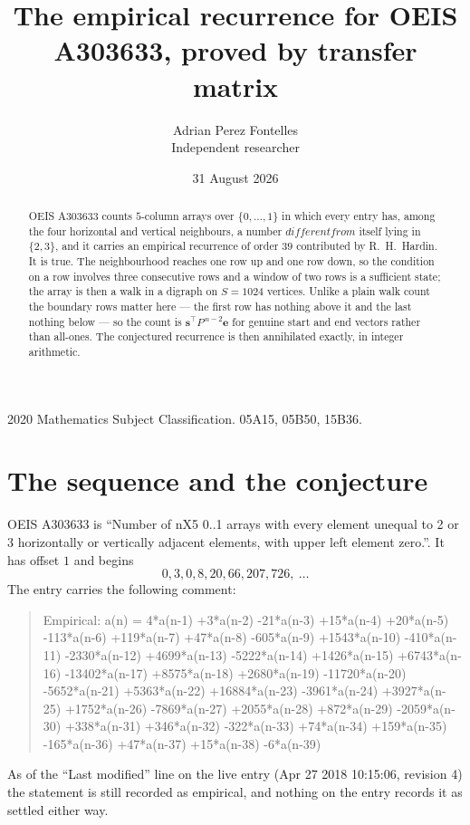 \documentclass[11pt,a4paper]{article}
\title{The empirical recurrence for OEIS A303633, proved by transfer matrix}
\author{Adrian Perez Fontelles\\ \small Independent researcher}
\date{31 August 2026}
\theoremstyle{plain}
\theoremstyle{definition}
\begin{document}
\maketitle

\begin{abstract}
OEIS A303633 counts $5$-column arrays over $\{0,\dots,1\}$ in which every entry has,
among the four horizontal and vertical neighbours, a number $different from$ itself lying in $\{2,3\}$, and it carries an empirical
recurrence of order $39$ contributed by R.~H.~Hardin. It is true. The neighbourhood
reaches one row up and one row down, so the condition on a row involves three consecutive
rows and a window of two rows is a sufficient state; the array is then a walk in a digraph
on $S=1024$ vertices. Unlike a plain walk count the boundary rows matter here --- the first
row has nothing above it and the last nothing below --- so the count is
$\mathbf{s}^{\!\top}P^{\,n-2}\mathbf{e}$ for genuine start and end vectors rather than
all-ones. The conjectured recurrence is then annihilated exactly, in integer arithmetic.
\end{abstract}

\noindent\small 2020 Mathematics Subject Classification. 05A15, 05B50, 15B36.\normalsize

\section{The sequence and the conjecture}

OEIS A303633 is ``Number of nX5 0..1 arrays with every element unequal to 2 or 3 horizontally or vertically adjacent elements, with upper left element zero.''. It has offset
$1$ and begins
\[
0, 3, 0, 8, 20, 66, 207, 726,\ \dots
\]
The entry carries the following comment:
\begin{quote}\small
Empirical: a(n) = 4*a(n-1) +3*a(n-2) -21*a(n-3) +15*a(n-4) +20*a(n-5) -113*a(n-6) +119*a(n-7) +47*a(n-8) -605*a(n-9) +1543*a(n-10) -410*a(n-11) -2330*a(n-12) +4699*a(n-13) -5222*a(n-14) +1426*a(n-15) +6743*a(n-16) -13402*a(n-17) +8575*a(n-18) +2680*a(n-19) -11720*a(n-20) -5652*a(n-21) +5363*a(n-22) +16884*a(n-23) -3961*a(n-24) +3927*a(n-25) +1752*a(n-26) -7869*a(n-27) +2055*a(n-28) +872*a(n-29) -2059*a(n-30) +338*a(n-31) +346*a(n-32) -322*a(n-33) +74*a(n-34) +159*a(n-35) -165*a(n-36) +47*a(n-37) +15*a(n-38) -6*a(n-39)
\end{quote}
As of the ``Last modified'' line on the live entry (Apr 27 2018 10:15:06, revision
4) the statement is still recorded as empirical, and nothing on the entry
records it as settled either way.
\end{document}
